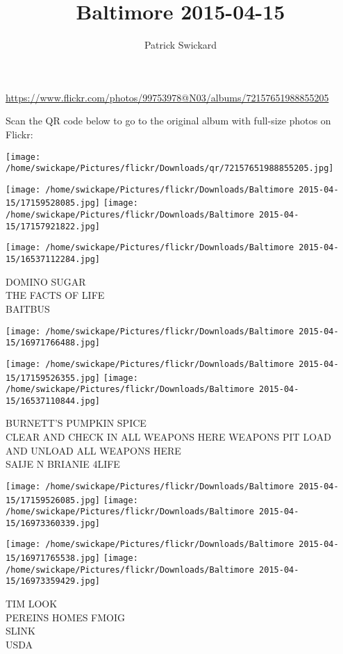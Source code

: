 \documentclass[10pt,letterpaper]{article}
\title{Baltimore 2015-04-15}
\author{Patrick Swickard}
\date{}
\begin{document}
\maketitle

\url{https://www.flickr.com/photos/99753978@N03/albums/72157651988855205}

Scan the QR code below to go to the original album with full-size photos on Flickr:

\texttt{[image: /home/swickape/Pictures/flickr/Downloads/qr/72157651988855205.jpg]}
\pagebreak

\texttt{[image: /home/swickape/Pictures/flickr/Downloads/Baltimore 2015-04-15/17159528085.jpg]}
\texttt{[image: /home/swickape/Pictures/flickr/Downloads/Baltimore 2015-04-15/17157921822.jpg]}

\texttt{[image: /home/swickape/Pictures/flickr/Downloads/Baltimore 2015-04-15/16537112284.jpg]}

DOMINO SUGAR\\
THE FACTS OF LIFE\\
BAITBUS
\pagebreak

\texttt{[image: /home/swickape/Pictures/flickr/Downloads/Baltimore 2015-04-15/16971766488.jpg]}

\vspace{0.25in}
\texttt{[image: /home/swickape/Pictures/flickr/Downloads/Baltimore 2015-04-15/17159526355.jpg]}
\texttt{[image: /home/swickape/Pictures/flickr/Downloads/Baltimore 2015-04-15/16537110844.jpg]}

BURNETT'S PUMPKIN SPICE\\
CLEAR AND CHECK IN ALL WEAPONS HERE WEAPONS PIT LOAD AND UNLOAD ALL WEAPONS HERE\\
SAIJE N BRIANIE 4LIFE
\pagebreak

\texttt{[image: /home/swickape/Pictures/flickr/Downloads/Baltimore 2015-04-15/17159526085.jpg]}
\texttt{[image: /home/swickape/Pictures/flickr/Downloads/Baltimore 2015-04-15/16973360339.jpg]}

\texttt{[image: /home/swickape/Pictures/flickr/Downloads/Baltimore 2015-04-15/16971765538.jpg]}
\texttt{[image: /home/swickape/Pictures/flickr/Downloads/Baltimore 2015-04-15/16973359429.jpg]}

TIM LOOK\\
PEREINS HOMES FMOIG\\
SLINK\\
USDA
\pagebreak
\end{document}
